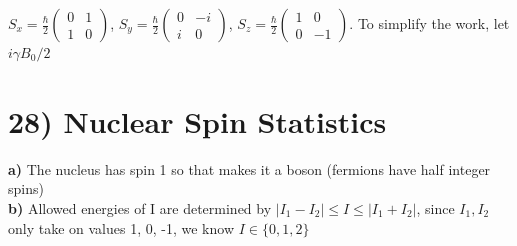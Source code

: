 \documentclass[12pt]{article}
\begin{document}
$S_x =  \frac\hbar2\begin{pmatrix} 0 & 1\\1 & 0 \end{pmatrix}$, $S_y =   \frac\hbar2\begin{pmatrix} 0 & -i\\i & 0 \end{pmatrix}$, $S_z =  \frac\hbar2\begin{pmatrix} 1 & 0\\0 & -1 \end{pmatrix}$. To simplify the work, let $i\gamma B_0/2$

\section*{28) Nuclear Spin Statistics}
\textbf{a)} The nucleus has spin 1 so that makes it a boson (fermions have half integer spins)\\
\textbf{b)} Allowed energies of I are determined by $|I_1-I_2|\leq I \leq|I_1+I_2|$, since $I_1,I_2$ only take on values 1, 0, -1, we know $I\in\{0,1,2\}$\\
\end{document}
